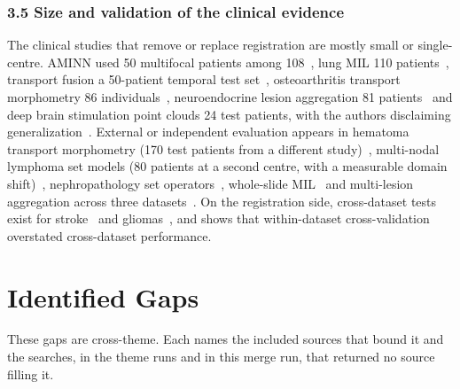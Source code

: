 \documentclass[journal,onecolumn]{IEEEtran}
\begin{document}
\subsubsection{3.5 Size and validation of the clinical evidence}

The clinical studies that remove or replace registration are mostly small or single-centre. AMINN used 50 multifocal patients among 108~\cite{Chen2021AMINN}, lung MIL 110 patients~\cite{Chen2022LungMIL}, transport fusion a 50-patient temporal test set~\cite{Gong2026Robust}, osteoarthritis transport morphometry 86 individuals~\cite{Kundu2020Enabling}, neuroendocrine lesion aggregation 81 patients~\cite{Sabouri2025Enhancing} and deep brain stimulation point clouds 24 test patients, with the authors disclaiming generalization~\cite{Liu2026Three}. External or independent evaluation appears in hematoma transport morphometry (170 test patients from a different study)~\cite{Ironside2025Predictive}, multi-nodal lymphoma set models (80 patients at a second centre, with a measurable domain shift)~\cite{Karimzadeh2026Revisiting}, nephropathology set operators~\cite{Zare2025PICASO}, whole-slide MIL~\cite{Lu2021CLAM} and multi-lesion aggregation across three datasets~\cite{Geady2025Radiomic}. On the registration side, cross-dataset tests exist for stroke~\cite{Bonkhoff2024Prediction,Bowren2022Poststroke,Brzus2026Clinical} and gliomas~\cite{Liu2023Coordinatized}, and \cite{Bonkhoff2024Prediction} shows that within-dataset cross-validation overstated cross-dataset performance.

\section{Identified Gaps}

These gaps are cross-theme. Each names the included sources that bound it and the searches, in the theme runs and in this merge run, that returned no source filling it.
\end{document}
